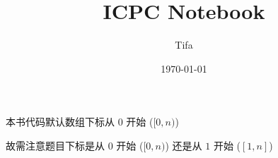 \documentclass{ICPCnotebook}
\title{\vspace{-4ex}\Large{ICPC Notebook}}
\author{Tifa}
\date{\today}
\begin{document}
    \maketitle

    \pagestyle{plain}

	\setcounter{page}{1}

    \begin{multicols}{2}
        \tableofcontents
    \end{multicols}

    \newpage
    本书代码默认数组下标从 \(0\) 开始 (\([0, n)\))

    故需注意题目下标是从 \(0\) 开始 (\([0, n)\)) 还是从 \(1\) 开始 (\([1, n]\))

    \newpage
	\pagestyle{fancy}
	\setcounter{page}{1}

    
    

    
    
\end{document}
